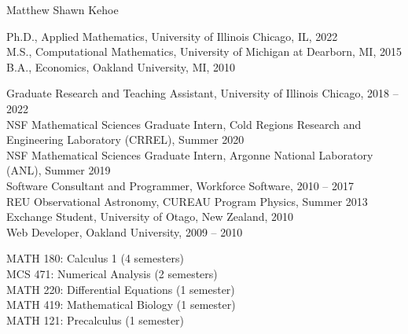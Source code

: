 \vita
{}
\begin{singlespace}
    \begin{description}[labelwidth=4cm,leftmargin=4.2cm,itemsep=1em]

        \item[NAME] Matthew Shawn Kehoe

        \item[EDUCATION] Ph.D., Applied Mathematics, University of Illinois Chicago, IL, 2022
        \newline
        \\
        M.S., Computational Mathematics, University of Michigan at Dearborn, MI, 2015
        \newline
        \\
        B.A., Economics, Oakland University, MI, 2010
        
        \item[EXPERIENCE] Graduate Research and Teaching Assistant, University of Illinois Chicago, 2018 -- 2022
        \newline
        \\
        NSF Mathematical Sciences Graduate Intern, Cold Regions Research and Engineering Laboratory (CRREL), Summer 2020
        \newline
        \\
        NSF Mathematical Sciences Graduate Intern, Argonne National Laboratory (ANL), Summer 2019
        \newline
        \\
        Software Consultant and Programmer, Workforce Software, 2010 -- 2017
        \newline
        \\
        REU Observational Astronomy, CUREAU Program Physics, Summer 2013
        \newline
        \\
        Exchange Student, University of Otago, New Zealand, 2010
        \newline
        \\
        Web Developer, Oakland University, 2009 -- 2010
        

        \item[TEACHING] MATH 180: Calculus 1 (4 semesters)\\
        MCS 471: Numerical Analysis (2 semesters)\\
        MATH 220: Differential Equations (1 semester)\\
        MATH 419: Mathematical Biology (1 semester)\\
        MATH 121: Precalculus (1 semester)


\end{description}
\end{singlespace}
